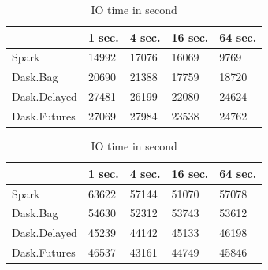 \documentclass[conference]{IEEEtran}
\begin{document}
\begin{table}[!t]
    \caption{Function time for the sleep experiment}
    \begin{subtable}[b]{\columnwidth}
        \renewcommand{\arraystretch}{1.3}
        \caption{Overhead time in second}\label{tab:inc_sleep_overhead}
        \centering
        \begin{tabular}{lllll}
        \hline
                     & 1 sec. & 4 sec. & 16 sec. & 64 sec. \\ \hline
        Spark        & 14992  & 17076  & 16069   & 9769    \\
        Dask.Bag     & 20690  & 21388  & 17759   & 18720   \\
        Dask.Delayed & 27481  & 26199  & 22080   & 24624   \\
        Dask.Futures & 27069  & 27984  & 23538   & 24762   \\ \hline
        \end{tabular}
    \end{subtable}
    \vskip 0.2cm
    \begin{subtable}[b]{\columnwidth}
        \renewcommand{\arraystretch}{1.3}
        \caption{IO time in second}\label{tab:inc_sleep_io}
        \centering
        \begin{tabular}{lllll}
        \hline
                     & 1 sec. & 4 sec. & 16 sec. & 64 sec. \\ \hline
        Spark        & 63622  & 57144  & 51070   & 57078   \\
        Dask.Bag     & 54630  & 52312  & 53743   & 53612   \\
        Dask.Delayed & 45239  & 44142  & 45133   & 46198   \\
        Dask.Futures & 46537  & 43161  & 44749   & 45846   \\ \hline
        \end{tabular}
    \end{subtable}
    \vspace{-3mm}
 \end{table}
\end{document}
